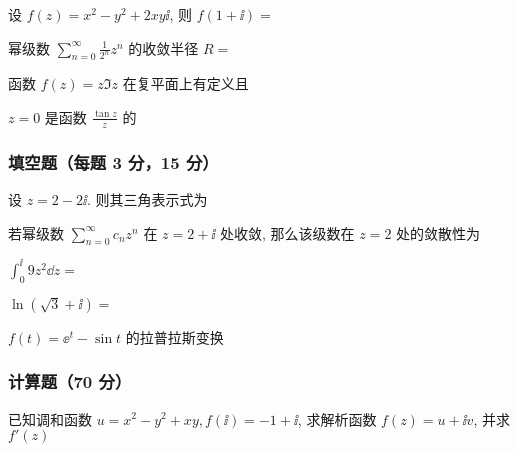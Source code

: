 \begin{ti}
	设 $f(z) = x^{2} - y^{2} + 2xy \ii$, 则 $f(1 + \ii) = $ \kuo
\end{ti}

\begin{ti}
	幂级数 $\sum_{n=0}^{\infty} \frac{1}{2^{n}} z^{n}$ 的收敛半径 $R = $ \kuo
\end{ti}

\begin{ti}
	函数 $f(z) = z \Im z$ 在复平面上有定义且 \kuo
\end{ti}

\begin{ti}
	$z = 0$ 是函数 $\frac{\tan z}{z}$ 的 \kuo
\end{ti}

\subsubsection{填空题（每题 3 分，15 分）}
\begin{ti}
	设 $z = 2 - 2 \ii$. 则其三角表示式为 \hua
\end{ti}

\begin{ti}
	若幂级数 $\sum_{n = 0}^{\infty} c_{n} z^{n}$ 在 $z = 2 + \ii$ 处收敛, 那么该级数在 $z = 2$ 处的敛散性为 \hua
\end{ti}

\begin{ti}
	$\int_{0}^{\ii} 9 z^{2} \dd{z} = $ \hua
\end{ti}

\begin{ti}
	$\ln(\sqrt{3} + \ii) = $ \hua
\end{ti}

\begin{ti}
	$f(t) = \ee^{t} - \sin t$ 的拉普拉斯变换 \hua
\end{ti}

\subsubsection{计算题（70 分）}
\begin{ti}[10 分]
	已知调和函数 $u = x^{2} - y^{2} + xy, f(\ii) = - 1 + \ii$, 求解析函数 $f(z) = u + \ii v$, 并求 $f'(z)$
\end{ti}

